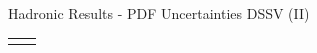 \begin{frame}{Hadronic Results - PDF Uncertainties DSSV (II)}
\begin{tabular}{wn}
\begin{center}

\end{center}
\end{tabular}
\end{frame}
